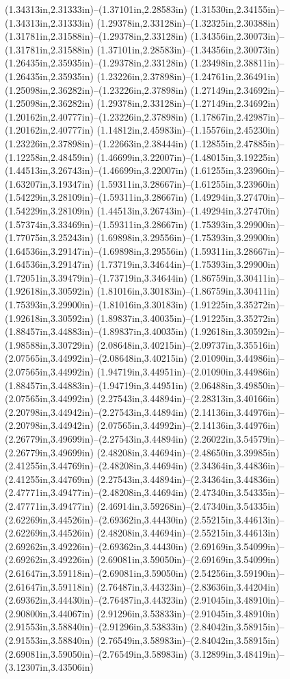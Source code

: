 (1.34313in,2.31333in)--(1.37101in,2.28583in) (1.31530in,2.34155in)--(1.34313in,2.31333in) (1.29378in,2.33128in)--(1.32325in,2.30388in) (1.31781in,2.31588in)--(1.29378in,2.33128in) (1.34356in,2.30073in)--(1.31781in,2.31588in) (1.37101in,2.28583in)--(1.34356in,2.30073in) (1.26435in,2.35935in)--(1.29378in,2.33128in) (1.23498in,2.38811in)--(1.26435in,2.35935in) (1.23226in,2.37898in)--(1.24761in,2.36491in) (1.25098in,2.36282in)--(1.23226in,2.37898in) (1.27149in,2.34692in)--(1.25098in,2.36282in) (1.29378in,2.33128in)--(1.27149in,2.34692in) (1.20162in,2.40777in)--(1.23226in,2.37898in) (1.17867in,2.42987in)--(1.20162in,2.40777in) (1.14812in,2.45983in)--(1.15576in,2.45230in) (1.23226in,2.37898in)--(1.22663in,2.38444in) (1.12855in,2.47885in)--(1.12258in,2.48459in) (1.46699in,3.22007in)--(1.48015in,3.19225in) (1.44513in,3.26743in)--(1.46699in,3.22007in) (1.61255in,3.23960in)--(1.63207in,3.19347in) (1.59311in,3.28667in)--(1.61255in,3.23960in) (1.54229in,3.28109in)--(1.59311in,3.28667in) (1.49294in,3.27470in)--(1.54229in,3.28109in) (1.44513in,3.26743in)--(1.49294in,3.27470in) (1.57374in,3.33469in)--(1.59311in,3.28667in) (1.75393in,3.29900in)--(1.77075in,3.25243in) (1.69898in,3.29556in)--(1.75393in,3.29900in) (1.64536in,3.29147in)--(1.69898in,3.29556in) (1.59311in,3.28667in)--(1.64536in,3.29147in) (1.73719in,3.34644in)--(1.75393in,3.29900in) (1.72051in,3.39479in)--(1.73719in,3.34644in) (1.86759in,3.30411in)--(1.92618in,3.30592in) (1.81016in,3.30183in)--(1.86759in,3.30411in) (1.75393in,3.29900in)--(1.81016in,3.30183in) (1.91225in,3.35272in)--(1.92618in,3.30592in) (1.89837in,3.40035in)--(1.91225in,3.35272in) (1.88457in,3.44883in)--(1.89837in,3.40035in) (1.92618in,3.30592in)--(1.98588in,3.30729in) (2.08648in,3.40215in)--(2.09737in,3.35516in) (2.07565in,3.44992in)--(2.08648in,3.40215in) (2.01090in,3.44986in)--(2.07565in,3.44992in) (1.94719in,3.44951in)--(2.01090in,3.44986in) (1.88457in,3.44883in)--(1.94719in,3.44951in) (2.06488in,3.49850in)--(2.07565in,3.44992in) (2.27543in,3.44894in)--(2.28313in,3.40166in) (2.20798in,3.44942in)--(2.27543in,3.44894in) (2.14136in,3.44976in)--(2.20798in,3.44942in) (2.07565in,3.44992in)--(2.14136in,3.44976in) (2.26779in,3.49699in)--(2.27543in,3.44894in) (2.26022in,3.54579in)--(2.26779in,3.49699in) (2.48208in,3.44694in)--(2.48650in,3.39985in) (2.41255in,3.44769in)--(2.48208in,3.44694in) (2.34364in,3.44836in)--(2.41255in,3.44769in) (2.27543in,3.44894in)--(2.34364in,3.44836in) (2.47771in,3.49477in)--(2.48208in,3.44694in) (2.47340in,3.54335in)--(2.47771in,3.49477in) (2.46914in,3.59268in)--(2.47340in,3.54335in) (2.62269in,3.44526in)--(2.69362in,3.44430in) (2.55215in,3.44613in)--(2.62269in,3.44526in) (2.48208in,3.44694in)--(2.55215in,3.44613in) (2.69262in,3.49226in)--(2.69362in,3.44430in) (2.69169in,3.54099in)--(2.69262in,3.49226in) (2.69081in,3.59050in)--(2.69169in,3.54099in) (2.61647in,3.59118in)--(2.69081in,3.59050in) (2.54256in,3.59190in)--(2.61647in,3.59118in) (2.76487in,3.44323in)--(2.83636in,3.44204in) (2.69362in,3.44430in)--(2.76487in,3.44323in) (2.91045in,3.48910in)--(2.90800in,3.44067in) (2.91296in,3.53833in)--(2.91045in,3.48910in) (2.91553in,3.58840in)--(2.91296in,3.53833in) (2.84042in,3.58915in)--(2.91553in,3.58840in) (2.76549in,3.58983in)--(2.84042in,3.58915in) (2.69081in,3.59050in)--(2.76549in,3.58983in) (3.12899in,3.48419in)--(3.12307in,3.43506in) 